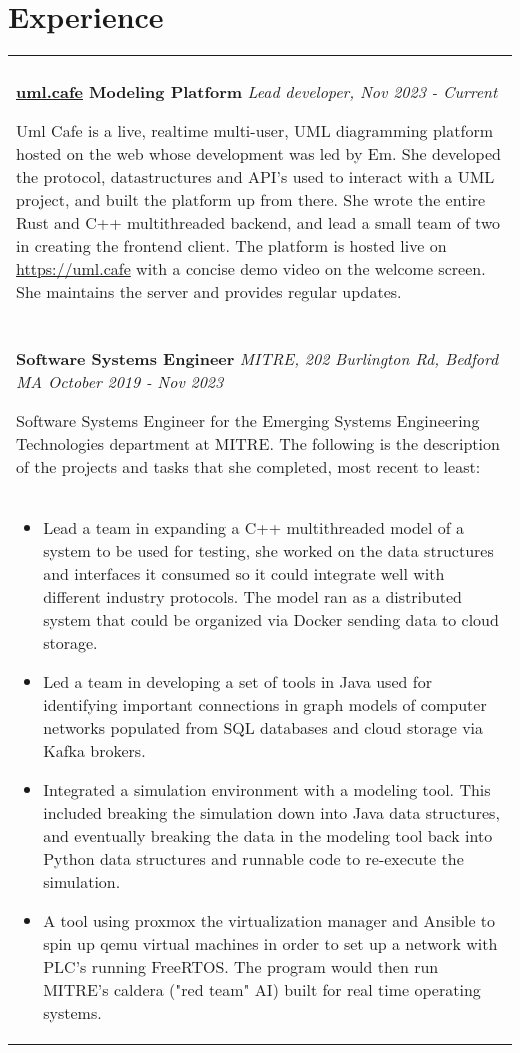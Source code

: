 \documentclass[11pt]{article}
\begin{document}
\section*{Experience}
\begin{tabular}{p{18.5cm}}
    \hline
    \multicolumn{1}{c}{} \\

     \large \textbf{\href{https://uml.cafe}{uml.cafe} Modeling Platform} \normalsize \textit{Lead developer, \hfill Nov 2023 - Current}

     \> Uml Cafe is a live, realtime multi-user, UML diagramming platform hosted on the web whose development was led 
     by Em. She developed the protocol, datastructures and API's used to interact with a UML project, and built the platform up from there. She wrote the
     entire Rust and C++ multithreaded backend, and lead a small team of two in creating the frontend client. The platform is hosted live on 
     \url{https://uml.cafe} with a concise demo video on the welcome screen. She maintains the server and provides regular updates.\\
 
     \multicolumn{1}{c}{} \\

    \large \textbf{Software Systems Engineer} \normalsize \textit{MITRE, 202 Burlington Rd, Bedford MA \hfill October 2019 - Nov 2023}

    \> Software Systems Engineer for the Emerging Systems Engineering Technologies department at MITRE. The following is the 
    description of the projects and tasks that she completed, most recent to least:\\ 

    \begin{itemize}[noitemsep,topsep=0pt]
      \item Lead a team in expanding a C++ multithreaded model of a system to be used for testing, she worked on the data structures and interfaces it consumed so it could 
      integrate well with different industry protocols. The model ran as a distributed system that could be organized via Docker sending data to cloud storage.
      \item Led a team in developing a set of tools in Java used for identifying important connections in graph models of computer networks populated from SQL 
      databases and cloud storage via Kafka brokers.
      \item Integrated a simulation environment with a modeling tool. This included breaking the simulation down into Java data structures, and eventually breaking the
      data in the modeling tool back into Python data structures and runnable code to re-execute the simulation.
      \item A tool using proxmox the virtualization manager and Ansible to spin up qemu virtual machines in order to set up a network with PLC's running FreeRTOS.
      The program would then run MITRE's caldera ("red team" AI) built for real time operating systems.
    \end{itemize}\\


\end{tabular}
\end{document}
